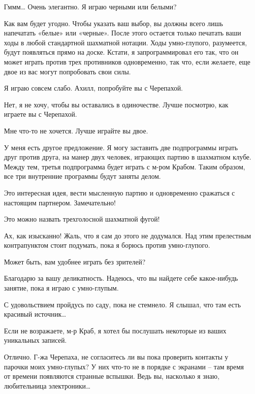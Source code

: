 \documentclass[../main.tex]{subfiles}
\begin{document}
\begin{dialogue}
 Гммм\ldots{} Очень элегантно. Я играю черными или белыми?

 Как вам будет угодно. Чтобы указать ваш выбор, вы должны всего лишь напечатать «белые» или «черные». После этого остается только печатать ваши ходы в любой стандартной шахматной нотации. Ходы умно-глупого, разумеется, будут появляться прямо на доске. Кстати, я запрограммировал его так, что он может играть против трех противников одновременно, так что, если желаете, еще двое из вас могут попробовать свои силы.

 Я играю совсем слабо. Ахилл, попробуйте вы с Черепахой.

 Нет, я не хочу, чтобы вы оставались в одиночестве. Лучше посмотрю, как играете вы с Черепахой.

 Мне что-то не хочется. Лучше играйте вы двое.

 У меня есть другое предложение. Я могу заставить две подпрограммы играть друг против друга, на манер двух человек, играющих партию в шахматном клубе. Между тем, третья подпрограмма будет играть с м-ром Крабом. Таким образом, все три внутренние программы будут заняты делом.

 Это интересная идея, вести мысленную партию и одновременно сражаться с настоящим партнером. Замечательно!

 Это можно назвать трехголосной шахматной фугой!

 Ах, как изысканно! Жаль, что я сам до этого не додумался. Над этим прелестным контрапунктом стоит подумать, пока я борюсь против умно-глупого.

 Может быть, вам удобнее играть без зрителей?

 Благодарю за вашу деликатность. Надеюсь, что вы найдете себе какое-нибудь занятие, пока я играю с умно-глупым.

 С удовольствием пройдусь по саду, пока не стемнело. Я слышал, что там есть красивый источник\ldots{}

 Если не возражаете, м-р Краб, я хотел бы послушать некоторые из ваших уникальных записей.

 Отлично. Г-жа Черепаха, не согласитесь ли вы пока проверить контакты у парочки моих умно-глупых? У них что-то не в порядке с экранами \--- там время от времени появляются странные вспышки. Ведь вы, насколько я знаю, любительница электроники\ldots{}


\end{dialogue}
\end{document}
